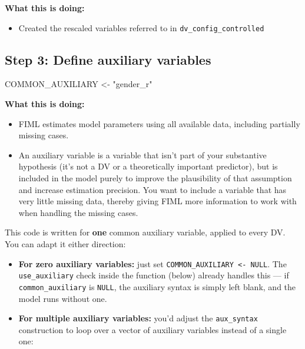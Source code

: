 \documentclass[
  letterpaper,
  DIV=11,
  numbers=noendperiod]{scrreprt}
\newenvironment{Shaded}{\begin{snugshade}}{\end{snugshade}}
\newcommand{\NormalTok}[1]{\textcolor[rgb]{0.00,0.23,0.31}{#1}}
\newcommand{\OtherTok}[1]{\textcolor[rgb]{0.00,0.23,0.31}{#1}}
\newcommand{\StringTok}[1]{\textcolor[rgb]{0.13,0.47,0.30}{#1}}
\providecommand{\tightlist}{%
  \setlength{\itemsep}{0pt}\setlength{\parskip}{0pt}}\usepackage{longtable,booktabs,array}
\begin{document}
\textbf{What this is doing:}

\begin{itemize}
\tightlist
\item
  Created the rescaled variables referred to in
  \texttt{dv\_config\_controlled}
\end{itemize}

\subsection{Step 3: Define auxiliary
variables}\label{step-3-define-auxiliary-variables}

\begin{Shaded}
\begin{Highlighting}[]
\NormalTok{COMMON\_AUXILIARY }\OtherTok{\textless{}{-}} \StringTok{"gender\_r"}
\end{Highlighting}
\end{Shaded}

\textbf{What this is doing:}

\begin{itemize}
\item
  FIML estimates model parameters using all available data, including
  partially missing cases.
\item
  An auxiliary variable is a variable that isn't part of your
  substantive hypothesis (it's not a DV or a theoretically important
  predictor), but is included in the model purely to improve the
  plausibility of that assumption and increase estimation precision. You
  want to include a variable that has very little missing data, thereby
  giving FIML more information to work with when handling the missing
  cases.
\end{itemize}

This code is written for \textbf{one} common auxiliary variable, applied
to every DV. You can adapt it either direction:

\begin{itemize}
\item
  \textbf{For zero auxiliary variables:} just set
  \texttt{COMMON\_AUXILIARY\ \textless{}-\ NULL}. The
  \texttt{use\_auxiliary} check inside the function (below) already
  handles this --- if \texttt{common\_auxiliary} is \texttt{NULL}, the
  auxiliary syntax is simply left blank, and the model runs without one.
\item
  \textbf{For multiple auxiliary variables:} you'd adjust the
  \texttt{aux\_syntax} construction to loop over a vector of auxiliary
  variables instead of a single one:
\end{itemize}
\end{document}
